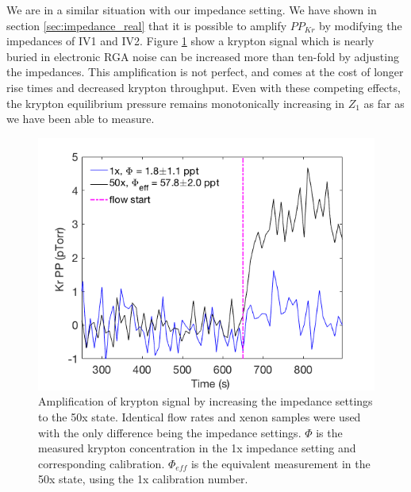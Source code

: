 \documentclass[12pt]{article}
\begin{document}
We are in a similar situation with our impedance setting. We have shown in section \ref{sec:impedance_real} that it is possible to amplify $PP_{Kr}$ by modifying the impedances of IV1 and IV2. Figure \ref{fig:ampimp} show a krypton signal which is nearly buried in electronic RGA noise can be increased more than ten-fold by adjusting the impedances. This amplification is not perfect, and comes at the cost of longer rise times and decreased krypton throughput. Even with these competing effects, the krypton equilibrium pressure remains monotonically increasing in $Z_1$ as far as we have been able to measure.
\begin{figure}[h]
  \includegraphics[width=\linewidth]{Figures/Adjusted_impedance_study.png}
  \caption{Amplification of krypton signal by increasing the impedance settings to the 50x state. Identical flow rates and xenon samples were used with the only difference being the impedance settings. $\Phi$ is the measured krypton concentration in the 1x impedance setting and corresponding calibration. $\Phi_{eff}$ is the equivalent measurement in the 50x state, using the 1x calibration number.  }
  \label{fig:ampimp}
\end{figure}
\end{document}
